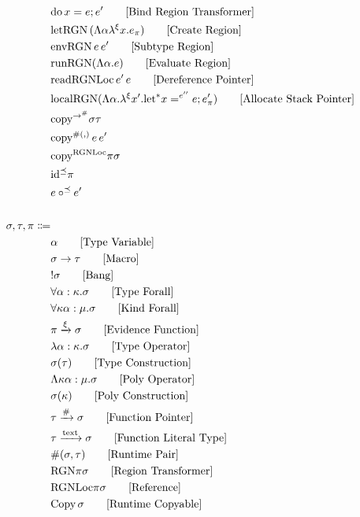 \documentclass {article}
\begin{document}
\begin{align*}
& \text{do} \, x = e; e' \tag*{[Bind Region Transformer]} \\
& \text{letRGN} \, (\Lambda \alpha \lambda^\xi x. e_\pi) \tag*{[Create Region]} \\
& \text{envRGN} \, e \, e' \tag*{[Subtype Region]} \\
& \text{runRGN} (\Lambda \alpha. e) \tag*{[Evaluate Region]} \\
& \text{readRGNLoc} \, e' \, e \tag*{[Dereference Pointer]} \\
& \text{localRGN} (\Lambda \alpha.\lambda^\xi x'. \text{let}^* x =^{e''} e; e'_\pi ) \tag*{[Allocate Stack Pointer]} \\
& \text{copy}^{\to^\#} \sigma \tau \\
& \text{copy}^{\#(,)} \, e \, e' \\
& \text{copy}^{\text{RGNLoc}} \pi \sigma \\
& \text{id}^\preceq \pi \\
& e \circ^\preceq e' \\
\\
\sigma, \tau, \pi \Coloneqq & \\
& \alpha \tag* {[Type Variable]} \\
& \sigma \to \tau \tag*{[Macro]} \\
& !\sigma \tag*{[Bang]} \\
& \forall \alpha : \kappa. \sigma \tag*{[Type Forall]}\\ 
& \forall \kappa \alpha : \mu. \sigma \tag*{[Kind Forall]}\\
& \pi \xrightarrow{\xi} \sigma \tag*{[Evidence Function]} \\
& \lambda \alpha : \kappa. \sigma \tag*{[Type Operator]} \\
& \sigma (\tau) \tag*{[Type Construction]} \\
& \Lambda \kappa \alpha : \mu. \sigma \tag*{[Poly Operator]} \\
& \sigma (\kappa) \tag*{[Poly Construction]} \\
& \tau \xrightarrow{\#} \sigma \tag*{[Function Pointer]}\\
& \tau \xrightarrow{\text{text}} \sigma  \tag*{[Function Literal Type]} \\
& \#(\sigma, \tau) \tag*{[Runtime Pair]} \\
& \text{RGN} \pi \sigma \tag*{[Region Transformer]} \\
& \text{RGNLoc} \pi \sigma \tag*{[Reference]} \\
& \text{Copy} \, \sigma \tag*{[Runtime Copyable]} \\

\end{align*}
\end{document}
